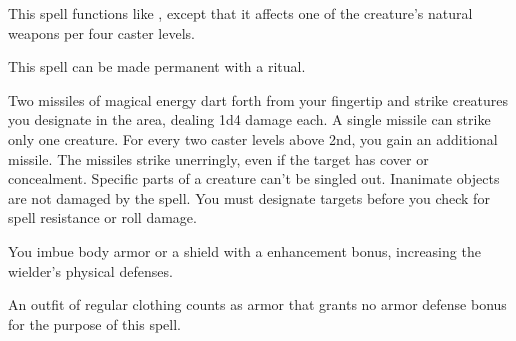 \begin{spelleffect}
  This spell functions like , except that it affects one of the creature's natural weapons per four caster levels.
\end{spelleffect}
\begin{spellnotes}
This spell can be made permanent with a  ritual.
\end{spellnotes}

\spellrng{\rngclose}
\begin{spelleffect}
  Two missiles of magical energy dart forth from your fingertip and strike creatures you designate in the area, dealing 1d4 damage each. A single missile can strike only one creature. For every two caster levels above 2nd, you gain an additional missile.
  The missiles strike unerringly, even if the target has cover or concealment. Specific parts of a creature can't be singled out. Inanimate objects are not damaged by the spell. You must designate targets before you check for spell resistance or roll damage.
\end{spelleffect}

\spellrng{\rngclose}
\spelldur{\durmed}
\begin{spelleffect}
  You imbue body armor or a shield with a  enhancement bonus, increasing the wielder's physical defenses. \bonusscalingdescription
\end{spelleffect}
\begin{spellnotes}
  An outfit of regular clothing counts as armor that grants no armor defense bonus for the purpose of this spell.
\end{spellnotes}

